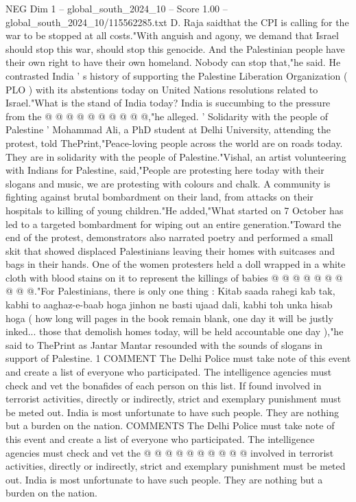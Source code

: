 \begin{textsample}{NEG Dim 1 – global\_south\_2024\_10 – Score 1.00 – global\_south\_2024\_10/115562285.txt}
D.
Raja saidthat the CPI is calling for the war to be stopped at all costs."With anguish and agony, we demand that Israel should stop this war, should stop this genocide.
And the Palestinian people have their own right to have their own homeland.
Nobody can stop that,"he said.
He contrasted India ' s history of supporting the Palestine Liberation Organization ( PLO ) with its abstentions today on United Nations resolutions related to Israel."What is the stand of India today?
India is succumbing to the pressure from the @ @ @ @ @ @ @ @ @ @,"he alleged. ' Solidarity with the people of Palestine ' Mohammad Ali, a PhD student at Delhi University, attending the protest, told ThePrint,"Peace-loving people across the world are on roads today.
They are in solidarity with the people of Palestine."Vishal, an artist volunteering with Indians for Palestine, said,"People are protesting here today with their slogans and music, we are protesting with colours and chalk.
A community is fighting against brutal bombardment on their land, from attacks on their hospitals to killing of young children."He added,"What started on 7 October has led to a targeted bombardment for wiping out an entire generation."Toward the end of the protest, demonstrators also narrated poetry and performed a small skit that showed displaced Palestinians leaving their homes with suitcases and bags in their hands.
One of the women protesters held a doll wrapped in a white cloth with blood stains on it to represent the killings of babies @ @ @ @ @ @ @ @ @ @."For Palestinians, there is only one thing : Kitab saada rahegi kab tak, kabhi to aaghaz-e-baab hoga jinhon ne basti ujaad dali, kabhi toh unka hisab hoga ( how long will pages in the book remain blank, one day it will be justly inked... those that demolish homes today, will be held accountable one day ),"he said to ThePrint as Jantar Mantar resounded with the sounds of slogans in support of Palestine. 1 COMMENT The Delhi Police must take note of this event and create a list of everyone who participated.
The intelligence agencies must check and vet the bonafides of each person on this list.
If found involved in terrorist activities, directly or indirectly, strict and exemplary punishment must be meted out.
India is most unfortunate to have such people.
They are nothing but a burden on the nation.
COMMENTS The Delhi Police must take note of this event and create a list of everyone who participated.
The intelligence agencies must check and vet the @ @ @ @ @ @ @ @ @ @ involved in terrorist activities, directly or indirectly, strict and exemplary punishment must be meted out.
India is most unfortunate to have such people.
They are nothing but a burden on the nation.

\end{textsample}
